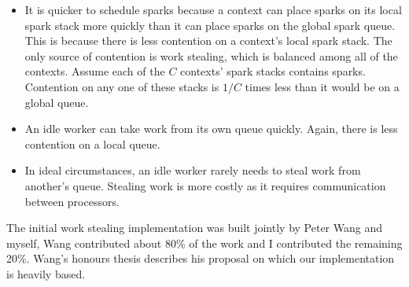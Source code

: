 \begin{itemize}

    \item
    It is quicker to schedule sparks because
    a context can place sparks on its local spark stack more quickly
    than it can place sparks on the global spark queue.
    This is because there is less contention on a context's
    local spark stack.
    The only source of contention is work stealing,
    which is balanced among all of the contexts.
    Assume each of the $C$ contexts' spark stacks contains sparks.
    Contention on any one of these stacks is $1/C$ times less than it would be
    on a global queue.

    \item
    An idle worker can take work from its own queue quickly.
    Again, there is less contention on a local queue.

    \item
    In ideal circumstances,
    an idle worker rarely needs to steal work from another's queue.
    Stealing work is more costly as it requires communication between
    processors.

\end{itemize}

The initial work stealing implementation was built jointly by
Peter Wang and myself,
Wang contributed about 80\% of the work
and I contributed the remaining 20\%.
Wang's honours thesis \citep{wang:2006:hons} describes his proposal on which
our implementation is heavily based.


